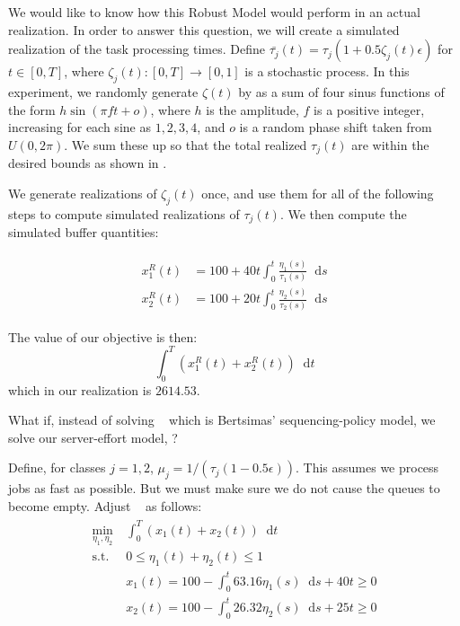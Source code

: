 \documentclass[11pt,a4paper,titlepage]{article}
\newcommand*{\dd}{\ensuremath{\mathop{}\!\mathrm{d}}}%
\theoremstyle{definition}
\theoremstyle{plain}
\begin{document}
    We would like to know how this Robust Model would perform in an actual realization.
    In order to answer this question,
    we will create a simulated realization of the task processing times.
    Define
    $\bar{\tau_j}(t) = \tau_j (1 + 0.5\zeta_j(t) \epsilon)$
    for $t \in [0,T]$,
    where $\zeta_j(t):[0,T] \to [0,1]$ is a stochastic process.
    In this experiment,
    we randomly generate $\zeta(t)$ by as a sum of four sinus functions of the form $h \sin(\pi f t + o)$,
    where $h$ is the amplitude,
    $f$ is a positive integer,
    increasing for each sine as $1,2,3,4$,
    and $o$ is a random phase shift taken  from $U(0,2\pi)$.
    We sum these up so that the total realized $\tau_j(t)$ are within the desired bounds as shown in .

    We generate realizations of $\zeta_j(t)$ once,
    and use them for all of the following steps
    to compute simulated realizations of $\tau_j(t)$.
    We then compute the simulated buffer quantities:

    \begin{align}
        \label{eq:buffer-robust-realization}
        \begin{split}
            x_1^R (t) &= 100 + 40 t \int_0^t \frac{\eta_1(s)}{\tau_1(s)} \dd s \\
            x_2^R (t) &= 100 + 20 t \int_0^t \frac{\eta_2(s)}{\tau_2(s)} \dd s
        \end{split}
    \end{align}

    The value of our objective is then:
    \begin{equation}
        \label{eq:cost-robust-realization}
        \int_0^T \left( x_1^R(t) + x_2^R(t) \right) \dd t
    \end{equation}
    which in our realization is $2614.53$.

    What if,
    instead of solving \modeltwo~ which is Bertsimas' sequencing-policy model,
    we solve our server-effort model,
    \modelone?

    Define,
    for classes $j=1,2$,
    $\mu_j=1/(\tau_j ( 1 - 0.5 \epsilon))$.
    This assumes we process jobs as fast as possible.
    But we must make sure we do not cause the queues to become empty.
    Adjust \modelone~ as follows:
    \begin{align}
        \label{eq:model-1-robust}
        \begin{split}
            \min\limits_{\eta_1, \eta_2}
            &~ \int_0^T \left( x_1(t) + x_2(t) \right) \dd t \\
            \text{s.t.}
            &~ 0 \leq \eta_1(t) + \eta_2(t) \leq 1 \\
            &~ x_1(t) = 100 - \int_0^t 63.16 \eta_1(s) \dd s + 40t \geq 0 \\
            &~ x_2(t) = 100 - \int_0^t 26.32 \eta_2(s) \dd s + 25t \geq 0
        \end{split}
    \end{align}
\end{document}
